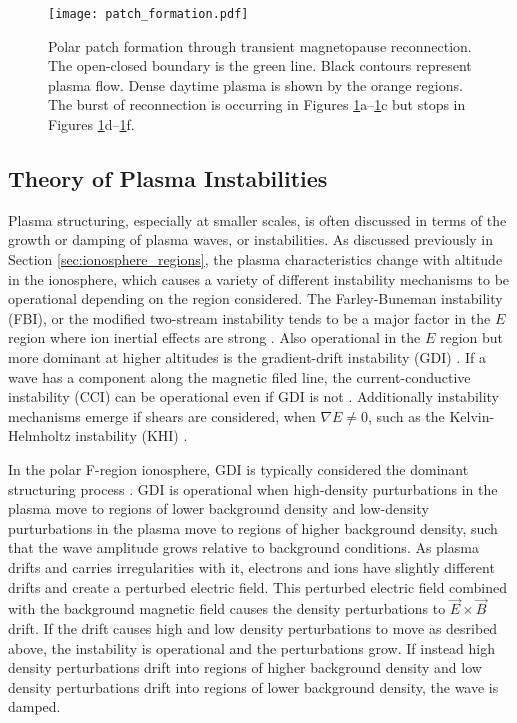 \begin{figure}
	\texttt{[image: patch\_formation.pdf]}
	\caption{Polar patch formation through transient magnetopause reconnection.  The open-closed boundary is the green line.  Black contours represent plasma flow.  Dense daytime plasma is shown by the orange regions.  The burst of reconnection is occurring in Figures \ref{fig:patch_formation}a--\ref{fig:patch_formation}c but stops in Figures \ref{fig:patch_formation}d--\ref{fig:patch_formation}f.}
	\label{fig:patch_formation}
\end{figure}

\subsection{Theory of Plasma Instabilities}
\label{sec:lit_instabilities}
Plasma structuring, especially at smaller scales, is often discussed in terms of the growth or damping of plasma waves, or instabilities.  As discussed previously in Section \ref{sec:ionosphere_regions}, the plasma characteristics change with altitude in the ionosphere, which causes a variety of different instability mechanisms to be operational depending on the region considered.  The Farley-Buneman instability (FBI), or the modified two-stream instability tends to be a major factor in the \(E\) region where ion inertial effects are strong \citep{Farley1963,Buneman1963}.  Also operational in the \(E\) region but more dominant at higher altitudes is the gradient-drift instability (GDI) \citep{Simon1963,Hoh1963,Linson1970}.  If a wave has a component along the magnetic filed line, the current-conductive instability (CCI) can be operational even if GDI is not \citep{Hoh1960,Ossakow1979,Chaturvedi1981}.  Additionally instability mechanisms emerge if shears are considered, when \(\nabla E \neq 0\), such as the Kelvin-Helmholtz instability (KHI) \citep{Kintner1977,DAngelo1965}.

In the polar F-region ionosphere, GDI is typically considered the dominant structuring process \citep{Weber1984,Cerisier1985,Basu1988,Tsunoda1988}.  GDI is operational when high-density purturbations in the plasma move to regions of lower background density and low-density purturbations in the plasma move to regions of higher background density, such that the wave amplitude grows relative to background conditions.  As plasma drifts and carries irregularities with it, electrons and ions have slightly different drifts and create a perturbed electric field.  This perturbed electric field combined with the background magnetic field causes the density perturbations to \(\vec{E}\times\vec{B}\) drift.  If the drift causes high and low density perturbations to move as desribed above, the instability is operational and the perturbations grow.  If instead high density perturbations drift into regions of higher background density and low density perturbations drift into regions of lower background density, the wave is damped.

